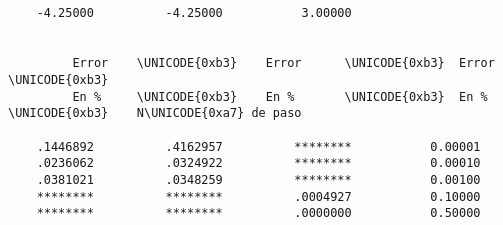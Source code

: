 \documentclass{article}
\begin{document}
\begin{verbatim}
                                                
 
    -4.25000          -4.25000           3.00000
                                                
 
         Error    \UNICODE{0xb3}    Error      \UNICODE{0xb3}  Error        \UNICODE{0xb3}             
         En %     \UNICODE{0xb3}    En %       \UNICODE{0xb3}  En %         \UNICODE{0xb3}    N\UNICODE{0xa7} de paso
 
    .1446892          .4162957          ********           0.00001
    .0236062          .0324922          ********           0.00010
    .0381021          .0348259          ********           0.00100
    ********          ********          .0004927           0.10000
    ********          ********          .0000000           0.50000
\end{verbatim}
\end{document}
